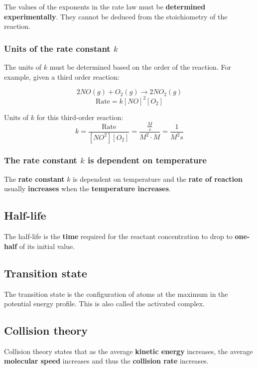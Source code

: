 \documentclass[11pt]{article}
\begin{document}
The values of the exponents in the rate law must be \textbf{determined experimentally}. They cannot be deduced from the stoichiometry of the reaction.
\\[0pt]

\subsubsection{Units of the rate constant \(k\)}
\label{sec:org96baf3b}

The units of \(k\) must be determined based on the order of the reaction. For example, given a third order reaction:

\[2NO(g) + O_2(g) \rightarrow 2NO_2 (g)\]
\[\text{Rate} = k[NO]^2[O_2]\]

Units of \(k\) for this third-order reaction:
\[k = \frac{\text{Rate}}{[NO^2][O_2]} = \frac{\frac{M}{s}}{M^2 \cdot M} = \frac{1}{M^2 s}\]

\subsubsection{The rate constant \(k\) is dependent on temperature}
\label{sec:org418defb}
The \textbf{rate constant} \(k\) is dependent on temperature and the \textbf{rate of reaction} usually \textbf{increases} when the \textbf{temperature increases}.

\subsection{Half-life}
\label{sec:org050967b}
The half-life is the \textbf{time} required for the reactant concentration to drop to \textbf{one-half} of its initial value.

\subsection{Transition state}
\label{sec:orgd1b4643}
The transition state is the configuration of atoms at the maximum in the potential energy profile. This is also called the activated complex.

\subsection{Collision theory}
\label{sec:org1bb204a}
Collision theory states that as the average \textbf{kinetic energy} increases, the average \textbf{molecular speed} increases and thus the \textbf{collision rate} increases.
\end{document}
